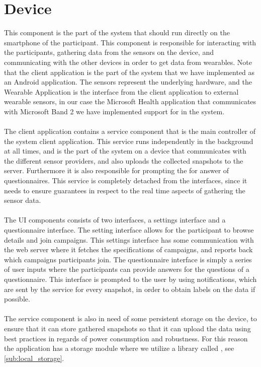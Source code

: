 \section{Device}
\label{sec:device}
This component is the part of the system that should run directly on the smartphone of the participant. This component is responsible for interacting with the participants, gathering data from the sensors on the device, and communicating with the other devices in order to get data from wearables. Note that the client application is the part of the system that we have implemented as an Android application. The sensors represent the underlying hardware, and the Wearable Application is the interface from the client application to external wearable sensors, in our case the Microsoft Health application that communicates with Microsoft Band 2 we have implemented support for in the system.
\\\\
The client application contains a service component that is the main controller of the system client application. This service runs independently in the background at all times, and is the part of the system on a device that communicates with the different sensor providers, and also uploads the collected snapshots to the server. Furthermore it is also responsible for prompting the for answer of questionnaires. This service is completely detached from the interfaces, since it needs to ensure guarantees in respect to the real time aspects of gathering the sensor data.
\\\\
The UI components consists of two interfaces, a settings interface and a questionnaire interface. The setting interface allows for the participant to browse details and join campaigns. This settings interface has some communication with the web server where it fetches the specifications of campaigns, and reports back which campaigns participants join. The questionnaire interface is simply a series of user inputs where the participants can provide answers for the questions of a questionnaire. This interface is prompted to the user by using notifications, which are sent by the service for every snapshot, in order to obtain labels on the data if possible.
\\\\
The service component is also in need of some persistent storage on the device, to ensure that it can store gathered snapshots so that it can upload the data using best practices in regards of power consumption and robustness. For this reason the application has a storage module where we utilize a library called , see \ref{sub:local_storage}.
